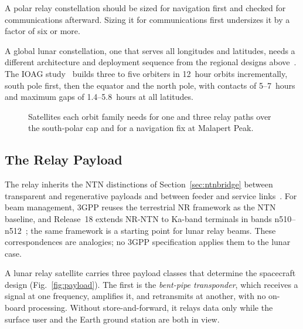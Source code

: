\documentclass{IEEEoj}
\begin{document}
\begin{remark}
A polar relay constellation should be sized for navigation first and checked for communications afterward. Sizing it for communications first undersizes it by a factor of six or more.
\end{remark}

A global lunar constellation, one that serves all longitudes and latitudes, needs a different architecture and deployment sequence from the regional designs above~\cite{cho_relay_coverage}. The IOAG study~\cite{ioag_lunar_arch} builds three to five orbiters in \SI{12}{hour} orbits incrementally, south pole first, then the equator and the north pole, with contacts of \SI{5}{}--\SI{7}{hours} and maximum gaps of \SI{1.4}{}--\SI{5.8}{hours} at all latitudes.

\begin{figure}[!t]
\centering
\resizebox{\columnwidth}{!}{}
\caption{Satellites each orbit family needs for one and three relay paths over the south-polar cap and for a navigation fix at Malapert Peak.}
\label{fig:commnav}
\end{figure}
\subsection{The Relay Payload}
\label{sec:payload}
The relay inherits the NTN distinctions of Section~\ref{sec:ntnbridge} between transparent and regenerative payloads and between feeder and service links~\cite{3gpp_tr_38821,3gpp_tr_38811,3gpp_ntn_overview}. For beam management, 3GPP reuses the terrestrial NR framework as the NTN baseline, and Release~18 extends NR-NTN to Ka-band terminals in bands n510--n512~\cite{3gpp_ts_38101_5,3gpp_rp240779}; the same framework is a starting point for lunar relay beams. These correspondences are analogies; no 3GPP specification applies them to the lunar case.

A lunar relay satellite carries three payload classes that determine the spacecraft design (Fig.~\ref{fig:payload}). The first is the \emph{bent-pipe transponder}, which receives a signal at one frequency, amplifies it, and retransmits at another, with no on-board processing. Without store-and-forward, it relays data only while the surface user and the Earth ground station are both in view.
\end{document}
